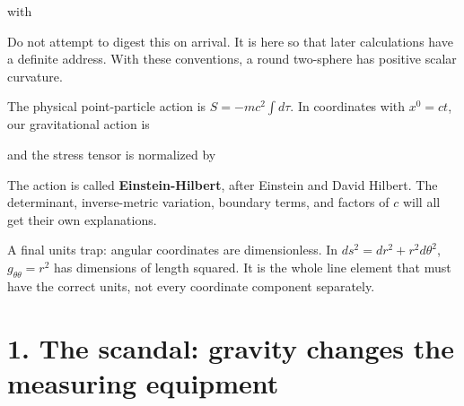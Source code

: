\documentclass[
  11pt,
  letterpaper,
  oneside,
  openany]{scrbook}
\begin{document}
with

\begin{center}
\begingroup
{}
\ifdim\wd\grmathbox>\linewidth
\resizebox{\linewidth}{!}{\usebox{\grmathbox}}
\else\usebox{\grmathbox}\fi
\endgroup
\end{center}

Do not attempt to digest this on arrival. It is here so that later
calculations have a definite address. With these conventions, a round
two-sphere has positive scalar curvature.

The physical point-particle action is \(S=-mc^2\int d\tau\). In
coordinates with \(x^0=ct\), our gravitational action is

\begin{center}
\begingroup
{}
\ifdim\wd\grmathbox>\linewidth
\resizebox{\linewidth}{!}{\usebox{\grmathbox}}
\else\usebox{\grmathbox}\fi
\endgroup
\end{center}

and the stress tensor is normalized by

\begin{center}
\begingroup
{}
\ifdim\wd\grmathbox>\linewidth
\resizebox{\linewidth}{!}{\usebox{\grmathbox}}
\else\usebox{\grmathbox}\fi
\endgroup
\end{center}

The action is called \textbf{Einstein-Hilbert}, after Einstein and David
Hilbert. The determinant, inverse-metric variation, boundary terms, and
factors of \(c\) will all get their own explanations.

A final units trap: angular coordinates are dimensionless. In
\(ds^2=dr^2+r^2d\theta^2\), \(g_{\theta\theta}=r^2\) has dimensions of
length squared. It is the whole line element that must have the correct
units, not every coordinate component separately.

\mainmatter

\hypertarget{chapter-1}{%
\chapter{1. The scandal: gravity changes the measuring
equipment}\label{chapter-1}}
\end{document}
